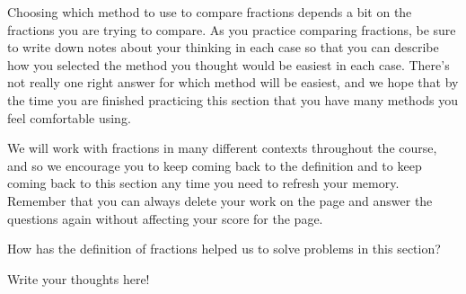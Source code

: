 \documentclass{ximera}
\begin{document}
Choosing which method to use to compare fractions depends a bit on the fractions you are trying to compare. As you practice comparing fractions, be sure to write down notes about your thinking in each case so that you can describe how you selected the method you thought would be easiest in each case. There's not really one right answer for which method will be easiest, and we hope that by the time you are finished practicing this section that you have many methods you feel comfortable using.



We will work with fractions in many different contexts throughout the course, and so we encourage you to keep coming back to the definition and to keep coming back to this section any time you need to refresh your memory. Remember that you can always delete your work on the page and answer the questions again without affecting your score for the page.
\begin{question}
How has the definition of fractions helped us to solve problems in this section?
\begin{freeResponse}
Write your thoughts here!
\end{freeResponse}
\end{question}
\end{document}
